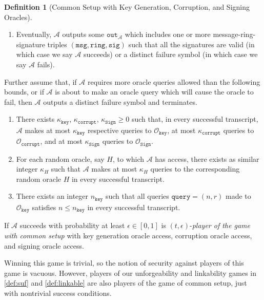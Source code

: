 \documentclass[11pt]{article}
\theoremstyle{definition}
\newtheorem{definition}[definition]{Definition}
\newcommand{\ring}{\texttt{ring}}
\newcommand{\sig}{\texttt{sig}}
\newcommand{\msg}{\texttt{msg}}
\newcommand{\sign}{\texttt{Sign}}
\newcommand{\corruptionOracle}{\mathcal{O}_{\texttt{corrupt}}}
\newcommand{\signingOracle}{\mathcal{O}_{\sign}}
\newcommand{\keyOracle}{\mathcal{O}_{\texttt{key}}}
\begin{document}
\begin{definition}[Common Setup with Key Generation, Corruption, and Signing Oracles]
\begin{enumerate}
\begin{enumerate}
\end{enumerate}
\item Eventually, $\mathcal{A}$ outputs some $\texttt{out}_\mathcal{A}$ which includes one or more message-ring-signature triples $(\msg, \ring, \sig)$ such that all the signatures are valid (in which case we say $\mathcal{A}$ succeeds) or a distinct failure symbol (in which case we say $\mathcal{A}$ fails).
\end{enumerate}

Further assume that, if $\mathcal{A}$ requires more oracle queries allowed than the following bounds, or if $\mathcal{A}$ is about to make an oracle query which will cause the oracle to fail, then $\mathcal{A}$ outputs a distinct failure symbol and terminates.
\begin{enumerate}
\item There exists $\kappa_{\texttt{key}}$, $\kappa_{\texttt{corrupt}}$, $\kappa_{\sign} \geq 0$ such that, in every successful transcript, $\mathcal{A}$ makes at most $\kappa_{\texttt{key}}$ respective queries to $\keyOracle$, at most $\kappa_{\texttt{corrupt}}$ queries to $\corruptionOracle$, and at most $\kappa_{\sign}$ queries to $\signingOracle$. 

\item For each random oracle, say $H$, to which $\mathcal{A}$ has access, there exists as similar integer $\kappa_{H}$ such that $\mathcal{A}$ makes at most $\kappa_{H}$ queries to the corresponding random oracle $H$ in every successful transcript. 

\item There exists an integer $n_{\texttt{key}}$ such that all queries $\texttt{query} = (n, r)$ made to $\keyOracle$ satisfies $n \leq n_{\texttt{key}}$ in every successful transcript.


\end{enumerate}

If $\mathcal{A}$ succeeds with probability at least $\epsilon \in [0,1]$ is $(t,\epsilon)$-\textit{player of the game with common setup} with key generation oracle access, corruption oracle access, and signing oracle access. 

\end{definition}

Winning this game is trivial, so the notion of security against players of this game is vacuous. However, players of our unforgeability and linkability games in \cref{def:suf} and \cref{def:linkable} are also players of the game of common setup, just with nontrivial success conditions.
\end{document}
